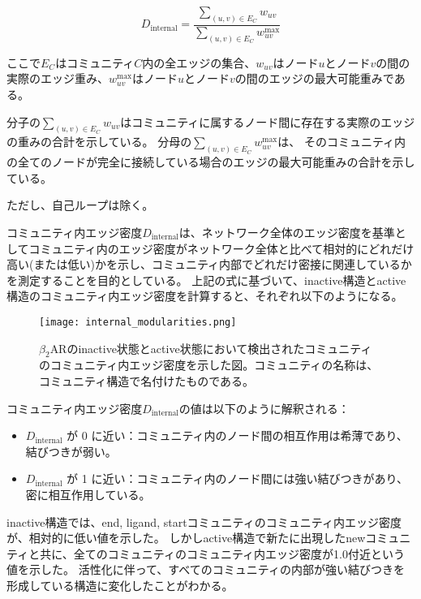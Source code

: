 \begin{equation}
D_{\text{internal}} = \frac{\sum_{(u,v) \in E_C} w_{uv}}{\sum_{(u,v) \in E_C} w_{uv}^{\text{max}}}
\label{eq:internal_density}
\end{equation}

ここで$E_C$はコミュニティ$C$内の全エッジの集合、$w_{uv}$はノード$u$とノード$v$の間の実際のエッジ重み、$w_{uv}^{\text{max}}$はノード$u$とノード$v$の間のエッジの最大可能重みである。

分子の$\sum_{(u,v) \in E_C} w_{uv}$はコミュニティに属するノード間に存在する実際のエッジの重みの合計を示している。
分母の$\sum_{(u,v) \in E_C} w_{uv}^{\text{max}}$は、
そのコミュニティ内の全てのノードが完全に接続している場合のエッジの最大可能重みの合計を示している。

ただし、自己ループは除く。


コミュニティ内エッジ密度$D_{\text{internal}}$は、ネットワーク全体のエッジ密度を基準としてコミュニティ内のエッジ密度がネットワーク全体と比べて相対的にどれだけ高い(または低い)かを示し、コミュニティ内部でどれだけ密接に関連しているかを測定することを目的としている。
上記の式に基づいて、inactive構造とactive構造のコミュニティ内エッジ密度を計算すると、それぞれ以下のようになる。

\begin{figure}[htbp]
    \centering
    \texttt{[image: internal\_modularities.png]}
    \caption{$\beta_2$ARのinactive状態とactive状態において検出されたコミュニティのコミュニティ内エッジ密度を示した図。コミュニティの名称は、コミュニティ構造で名付けたものである。}
    \label{fig:internal}
\end{figure}

\newpage

コミュニティ内エッジ密度$D_{\text{internal}}$の値は以下のように解釈される：
\begin{itemize}
    \item \( D_{\text{internal}} \) が 0 に近い：コミュニティ内のノード間の相互作用は希薄であり、結びつきが弱い。
    \item \( D_{\text{internal}} \) が 1 に近い：コミュニティ内のノード間には強い結びつきがあり、密に相互作用している。
\end{itemize}

inactive構造では、end, ligand, startコミュニティのコミュニティ内エッジ密度が、相対的に低い値を示した。
しかしactive構造で新たに出現したnewコミュニティと共に、全てのコミュニティのコミュニティ内エッジ密度が1.0付近という値を示した。
活性化に伴って、すべてのコミュニティの内部が強い結びつきを形成している構造に変化したことがわかる。

